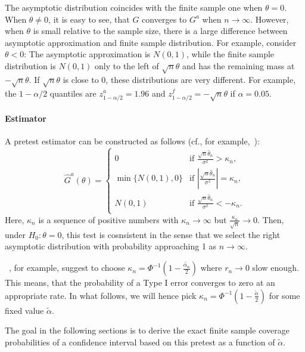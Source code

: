 \documentclass[12pt,a4paper,english]{article} %
\numberwithin{equation}{section}
\theoremstyle{definition}
\theoremstyle{remark}
\theoremstyle{plain}
\begin{document}
The asymptotic distribution coincides with the finite sample one when $\theta=0$.
When $\theta\neq0$, it is easy to see, that $G$ converges to $G^a$ when $n\to\infty$.
However, when $\theta$ is small relative to the sample size, there is a large difference between asymptotic approximation and finite sample distribution.
For example, consider $\theta < 0$: The asymptotic approximation is $N(0,1)$, while the finite sample distribution is $N(0,1)$ only to the left of $\sqrt{n}\theta$ and has the remaining mass at $-\sqrt{n}\theta$.
If $\sqrt{n}\theta$ is close to $0$, these distributions are very different.
For example, the $1-\alpha/2$ quantiles are $z^a_{1-\alpha/2} = 1.96$ and $z^f_{1-\alpha/2} = -\sqrt{n}\theta$ if $\alpha=0.05$.

\paragraph{Estimator}
A pretest estimator can be constructed as follows (cf., for example,~\cite{fang2019infdirdiff}):
\begin{equation}
  \hat{G}^a(\theta)=
    \begin{cases}
      0 & \text{if } \frac{\sqrt{n}\hat{\theta}_n}{\sigma^2} > \kappa_n,\\
      \min\{N(0,1), 0\}& \text{if } |\frac{\sqrt{n}\hat{\theta}_n}{\sigma^2}| = \kappa_n,\\
      N(0,1)& \text{if } \frac{\sqrt{n}\hat{\theta}_n}{\sigma^2} < - \kappa_n.\\
  \end{cases}
\end{equation}
Here, $\kappa_n$ is a sequence of positive numbers with $\kappa_n \to \infty$ but $\frac{\kappa_n}{\sqrt{n}} \to 0$.
Then, under $H_0: \theta = 0$, this test is cosnsistent in the sense that we select the right asymptotic distribution with probability approaching 1 as $n\to\infty$.

~\cite{fang2019infdirdiff}, for example, suggest to choose $\kappa_n = \Phi^{-1}(1-\frac{\tilde{\alpha_n}}{2})$ where $r_n\to 0$ slow enough.
This means, that the probability of a Type I error converges to zero at an appropriate rate.
In what follows, we will hence pick $\kappa_n = \Phi^{-1}(1-\frac{\tilde{\alpha}}{2})$ for some fixed value $\tilde{\alpha}$.

The goal in the following sections is to derive the exact finite sample coverage probabilities of a confidence interval based on this pretest as a function of $\tilde{\alpha}$.



\end{document}
